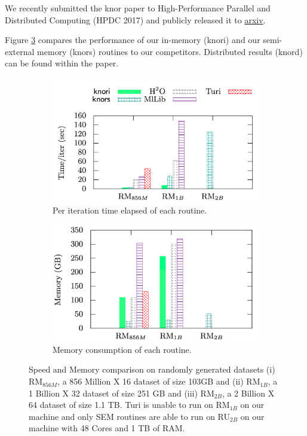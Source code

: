 \documentclass[simplex.tex]{subfiles}
\begin{document}
We recently submitted the \textsf{knor} paper to High-Performance Parallel and
Distributed Computing (HPDC 2017) and publicly released it to
\href{https://arxiv.org/abs/1606.08905}{arxiv}.

Figure \ref{fig:rmvm} compares the performance of our in-memory (\textsf{knori})
and our semi-external memory (\textsf{knors}) routines to our competitors.
Distributed results (\textsf{knord}) can be found within the paper.

\begin{figure}[!htb]
    \footnotesize
    \vspace{-25pt}
    \begin{subfigure}{1\textwidth}
        \centering
        \includegraphics[width=1\textwidth]{../../figs/perf.iter.rmvm.png}
        \caption{Per iteration time elapsed of each routine.}
        \label{fig:perf-rmvm}
    \end{subfigure}

    \begin{subfigure}{1\textwidth}
        \centering
        \includegraphics[width=1\textwidth]{../../figs/mem.rmvm.png}
        \caption{Memory consumption of each routine.}
        \label{fig:mem-rmvm}
    \end{subfigure}
    \caption{Speed and Memory comparison on randomly generated datasets
        (i) RM$_{856M}$, a 856 Million X 16 dataset of size 103GB and
        (ii) RM$_{1B}$, a 1 Billion X 32 dataset of size 251 GB and (iii) RM$_{2B}$,
        a 2 Billion X 64 dataset of size 1.1 TB. Turi is unable to run on RM$_{1B}$
        on our machine and only SEM routines are able to run on RU$_{2B}$ on our
    machine with 48 Cores and 1 TB of RAM.}
    \label{fig:rmvm}
\end{figure}
\end{document}
